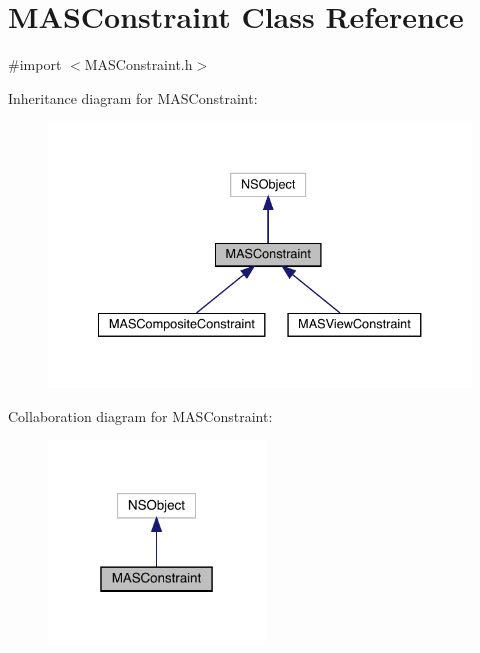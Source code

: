 \hypertarget{interface_m_a_s_constraint}{}\section{M\+A\+S\+Constraint Class Reference}
\label{interface_m_a_s_constraint}


{\ttfamily \#import $<$M\+A\+S\+Constraint.\+h$>$}



Inheritance diagram for M\+A\+S\+Constraint\+:\nopagebreak
\begin{figure}[H]
\begin{center}
\leavevmode
\includegraphics[width=334pt]{interface_m_a_s_constraint__inherit__graph}
\end{center}
\end{figure}


Collaboration diagram for M\+A\+S\+Constraint\+:\nopagebreak
\begin{figure}[H]
\begin{center}
\leavevmode
\includegraphics[width=163pt]{interface_m_a_s_constraint__coll__graph}
\end{center}
\end{figure}
